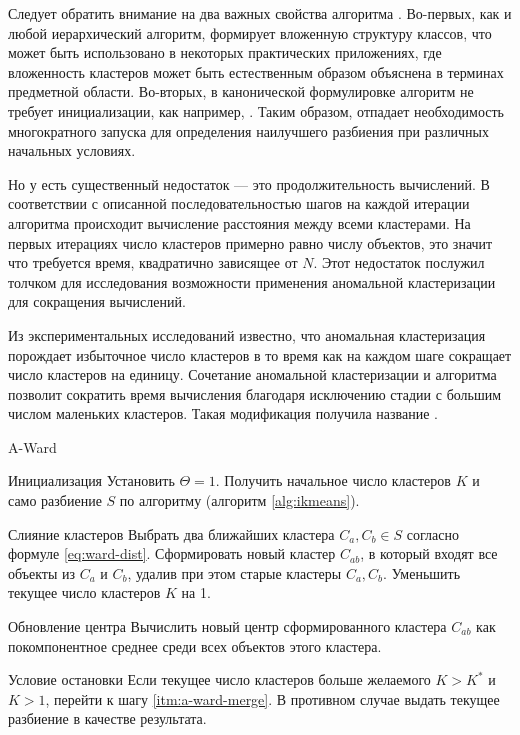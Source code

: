 \documentclass[12pt]{diploma}
\begin{document}
	Следует обратить внимание на два важных свойства алгоритма \Ward. Во-первых, как и любой иерархический алгоритм, \Ward формирует вложенную структуру классов, что может быть использовано в некоторых практических приложениях, где вложенность кластеров может быть естественным образом объяснена в терминах предметной области. Во-вторых, в канонической формулировке алгоритм не требует инициализации, как например, \kmeans. Таким образом, отпадает необходимость многократного запуска для определения наилучшего разбиения при различных начальных условиях.
	
	Но у \Ward есть существенный недостаток --- это продолжительность вычислений. В соответствии с описанной последовательностью шагов на каждой итерации алгоритма происходит вычисление расстояния между всеми кластерами. На первых итерациях число кластеров примерно равно числу объектов, это значит что требуется время, квадратично зависящее от $ N $. Этот недостаток послужил толчком для исследования возможности применения аномальной кластеризации для сокращения вычислений. 
	
	Из экспериментальных исследований известно, что аномальная кластеризация порождает избыточное число кластеров в то время как \Ward на каждом шаге сокращает число кластеров на единицу. Сочетание аномальной кластеризации и алгоритма \Ward позволит сократить время вычисления благодаря исключению стадии с большим числом маленьких кластеров. Такая модификация получила название \AWard \cite{amorim-makarenkov-mirkin}. 
	\begin{algorithm}{A-Ward}{}
		\begin{astep}{Инициализация \label{itm:a-ward-init}}
			Установить $ \Theta=1 $. Получить начальное число кластеров $ K $ и само разбиение  $ S $ по алгоритму \ikmeans (алгоритм  \ref{alg:ikmeans}).
		\end{astep}		
		\begin{astep}{Слияние кластеров \label{itm:a-ward-merge}}
			Выбрать два ближайших кластера $ C_a, C_b \in S $ согласно формуле \eqref{eq:ward-dist}.			
			Сформировать новый кластер $ C_{ab} $, в который входят все объекты из $ C_a $ и $ C_b $, удалив при этом старые кластеры $ C_a, C_b $.	Уменьшить текущее число кластеров $ K $ на 1. 
		\end{astep}
		\begin{astep}{Обновление центра}
			Вычислить новый центр сформированного кластера $ C_{ab} $ как покомпонентное среднее среди всех объектов этого кластера.
		\end{astep}
		\begin{astep}{Условие остановки}
			Если текущее число кластеров больше желаемого $ K>K^* $ и $ K>1 $, перейти к шагу \ref{itm:a-ward-merge}. В противном случае выдать текущее разбиение в качестве результата.
		\end{astep}
	\end{algorithm}
	
\end{document}
